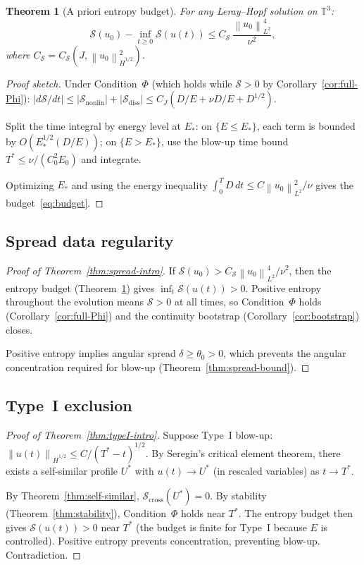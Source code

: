 \documentclass[11pt]{article}
\newtheorem{theorem}{Theorem}[section]
\theoremstyle{definition}
\newcommand{\T}{\mathbb{T}}
\newcommand{\norm}[1]{\left\| #1 \right\|}
\newcommand{\Hdot}[1]{\dot{H}^{#1}}
\newcommand{\cS}{\mathcal{S}}
\begin{document}
\begin{theorem}[A priori entropy budget]
\label{thm:budget}
For any Leray--Hopf solution on $\T^3$:
\begin{equation}\label{eq:budget}
\cS(u_0) - \inf_{t\geq 0}\cS(u(t))
\leq C_\cS\,\frac{\norm{u_0}_{L^2}^4}{\nu^2},
\end{equation}
where $C_\cS = C_\cS(J, \norm{u_0}_{\Hdot{1/2}}^2)$.
\end{theorem}

\begin{proof}[Proof sketch]
Under Condition~$\Phi$ (which holds while $\cS > 0$
by Corollary~\ref{cor:full-Phi}):
$|d\cS/dt| \leq |\cS_{\mathrm{nonlin}}|
+ |\cS_{\mathrm{diss}}|
\leq C_J(D/E + \nu D/E + D^{1/2})$.

Split the time integral by energy level at $E_*$:
on $\{E \leq E_*\}$, each term is bounded by
$O(E_*^{1/2}(D/E))$;
on $\{E > E_*\}$, use the blow-up time bound
$T^* \leq \nu/(C_0^2 E_0)$ and integrate.

Optimizing $E_*$ and using the energy inequality
$\int_0^T D\,dt \leq C\norm{u_0}_{L^2}^2/\nu$
gives the budget~\eqref{eq:budget}.
\end{proof}


\subsection{Spread data regularity}

\begin{proof}[Proof of Theorem~\ref{thm:spread-intro}]
If $\cS(u_0) > C_\cS\norm{u_0}_{L^2}^4/\nu^2$,
then the entropy budget (Theorem~\ref{thm:budget})
gives $\inf_t\cS(u(t)) > 0$.  Positive entropy
throughout the evolution means $\cS > 0$ at all times,
so Condition~$\Phi$ holds (Corollary~\ref{cor:full-Phi})
and the continuity bootstrap (Corollary~\ref{cor:bootstrap})
closes.

Positive entropy implies angular spread
$\delta \geq \theta_0 > 0$, which prevents the angular
concentration required for blow-up
(Theorem~\ref{thm:spread-bound}).
\end{proof}


\subsection{Type~I exclusion}

\begin{proof}[Proof of Theorem~\ref{thm:typeI-intro}]
Suppose Type~I blow-up: $\norm{u(t)}_{\Hdot{1/2}}
\leq C/(T^*-t)^{1/2}$.  By Seregin's critical element
theorem, there exists a self-similar profile $U^*$ with
$u(t) \to U^*$ (in rescaled variables) as $t \to T^*$.

By Theorem~\ref{thm:self-similar},
$\cS_{\mathrm{cross}}(U^*) = 0$.  By stability
(Theorem~\ref{thm:stability}), Condition~$\Phi$ holds
near $T^*$.  The entropy budget then gives
$\cS(u(t)) > 0$ near $T^*$ (the budget is finite for
Type~I because $E$ is controlled).  Positive entropy
prevents concentration, preventing blow-up.  Contradiction.
\end{proof}
\end{document}
